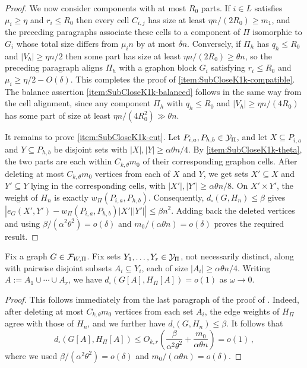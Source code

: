 \begin{proof}
We now consider components with at most $R_0$ parts. If $i\in L$ satisfies $\mu_i\geq\eta$ and $r_i\leq R_0$ then every cell $C_{i,j}$ has size at least $\eta n/(2R_0)\geq m_1$, and the preceding paragraphs associate these cells to a component of $\Pi$ isomorphic to $G_i$ whose total size differs from $\mu_i n$ by at most $\delta n$. Conversely, if $\Pi_h$ has $q_h\leq R_0$ and $|V_h|\geq\eta n/2$ then some part has size at least $\eta n/(2R_0)\geq\theta n$, so the preceding paragraph aligns $\Pi_h$ with a graphon block $G_i$ satisfying $r_i\leq R_0$ and $\mu_i\geq\eta/2-O(\delta)$. This completes the proof of \ref{item:SubCloseK1k-compatible}. The balance assertion \ref{item:SubCloseK1k-balanced} follows in the same way from the cell alignment, since any component $\Pi_h$ with $q_h\leq R_0$ and $|V_h|\geq\eta n/(4R_0)$ has some part of size at least $\eta n/(4R_0^2)\gg\theta n$.

It remains to prove \ref{item:SubCloseK1k-cut}. Let $P_{i,a},P_{h,b}\in{\mathcal Y}_{\Pi}$, and let $X\subseteq P_{i,a}$ and $Y\subseteq P_{h,b}$ be disjoint sets with $|X|,|Y|\geq \alpha\theta n/4$. By \ref{item:SubCloseK1k-theta}, the two parts are each within $C_{k,\theta}m_0$ of their corresponding graphon cells. After deleting at most $C_{k,\theta}m_0$ vertices from each of $X$ and $Y$, we get sets $X'\subseteq X$ and $Y'\subseteq Y$ lying in the corresponding cells, with $|X'|,|Y'|\geq \alpha\theta n/8$. On $X'\times Y'$, the weight of $H_n$ is exactly $w_{\Pi}(P_{i,a},P_{h,b})$. Consequently, $d_\square(G,H_n)\leq\beta$ gives $\left|e_G(X',Y')-w_{\Pi}(P_{i,a},P_{h,b})|X'||Y'|\right|\leq\beta n^2$. Adding back the deleted vertices and using $\beta/(\alpha^2\theta^2)=o(\delta)$ and $m_0/(\alpha\theta n)=o(\delta)$ proves the required result.
\end{proof}

\begin{corollary}\label{cor:cut-closeness}
Fix a graph $G\in{\mathcal F}_{W,\Pi}$. Fix sets $Y_1,\dots,Y_r\in{\mathcal Y}_\Pi$, not necessarily distinct, along with pairwise disjoint subsets $A_i\subseteq Y_i$, each of size $|A_i|\geq\alpha\theta n/4$. Writing $A:=A_1\cup\cdots\cup A_r$, we have $d_\square(G[A],H_\Pi[A])=o(1)$ as $\omega\to0$.
\end{corollary}
\begin{proof}
This follows immediately from the last paragraph of the proof of . Indeed, after deleting at most $C_{k,\theta}m_0$ vertices from each set $A_i$, the edge weights of $H_\Pi$ agree with those of $H_n$, and we further have $d_\square(G,H_n)\leq\beta$. It follows that
$$d_\square(G[A],H_\Pi[A])\leq O_{k,r}\!\left(\frac{\beta}{\alpha^2\theta^2}+\frac{m_0}{\alpha\theta n}\right)=o(1)\,,$$
where we used $\beta/(\alpha^2\theta^2)=o(\delta)$ and $m_0/(\alpha\theta n)=o(\delta)$.
\end{proof}

